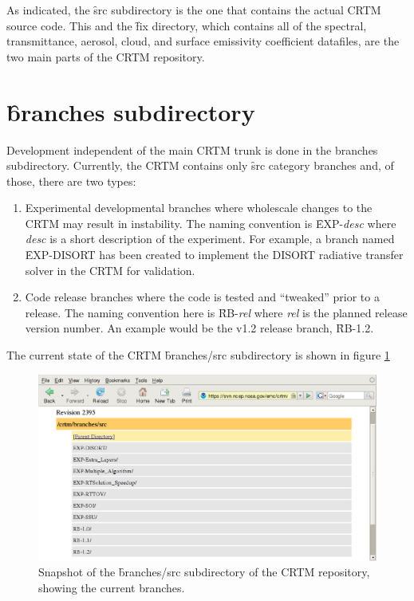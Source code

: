 As indicated, the \f{src} subdirectory is the one that contains the actual CRTM source code. This and the \f{fix}
directory, which contains all of the spectral, transmittance, aerosol, cloud, and surface emissivity coefficient datafiles, are the two main parts of the CRTM repository.


\section{\f{branches} subdirectory}
Development independent of the main CRTM trunk is done in the branches subdirectory. Currently, the CRTM contains only \f{src} category branches and, of those, there are two types:
\begin{enumerate}
  \item Experimental developmental branches where wholescale changes to the CRTM may result in instability. The naming convention is \f{EXP-}\textit{desc} where \textit{desc} is a short description of the experiment. For example, a branch named \f{EXP-DISORT} has been created to implement the DISORT radiative transfer solver in the CRTM for validation. 
  \item Code release branches where the code is tested and ``tweaked'' prior to a release. The naming convention here is \f{RB-}\textit{rel} where \textit{rel} is the planned release version number. An example would be the v1.2 release branch, \f{RB-1.2}.
\end{enumerate}
The current state of the CRTM \f{branches/src} subdirectory is shown in figure \ref{fig:branches_src_repository}
\begin{figure}[htb]
  \centering
  \includegraphics[scale=0.5]{graphics/branches_src_repository.eps}
  \caption{Snapshot of the \f{branches/src} subdirectory of the CRTM repository, showing the current branches.}
  \label{fig:branches_src_repository}
\end{figure}

